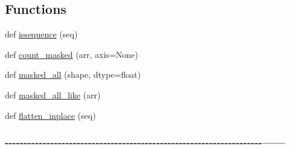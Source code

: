 \subsection*{Functions}
\begin{DoxyCompactItemize}
\item 
def \hyperlink{namespacenumpy_1_1ma_1_1extras_af0db0362baed65942454c90f46ec5225}{issequence} (seq)
\item 
def \hyperlink{namespacenumpy_1_1ma_1_1extras_ae890e9b4743408c9ee60752e32c6a0b1}{count\+\_\+masked} (arr, axis=None)
\item 
def \hyperlink{namespacenumpy_1_1ma_1_1extras_abf272f3fd4ed8843a5aa8c6e9ccd6b76}{masked\+\_\+all} (shape, dtype=float)
\item 
def \hyperlink{namespacenumpy_1_1ma_1_1extras_a7bf3347167eff6030c860d8015b63101}{masked\+\_\+all\+\_\+like} (arr)
\item 
def \hyperlink{namespacenumpy_1_1ma_1_1extras_ad204172520b08f4cc3ff746eef83eef8}{flatten\+\_\+inplace} (seq)
\begin{DoxyCompactList}\small\item\em \subsubsection*{-\/-\/-\/-\/-\/-\/-\/-\/-\/-\/-\/-\/-\/-\/-\/-\/-\/-\/-\/-\/-\/-\/-\/-\/-\/-\/-\/-\/-\/-\/-\/-\/-\/-\/-\/-\/-\/-\/-\/-\/-\/-\/-\/-\/-\/-\/-\/-\/-\/-\/-\/-\/-\/-\/-\/-\/-\/-\/-\/-\/-\/-\/-\/-\/-\/-\/-\/-\/------ }




\end{DoxyCompactList}
\end{DoxyCompactItemize}
